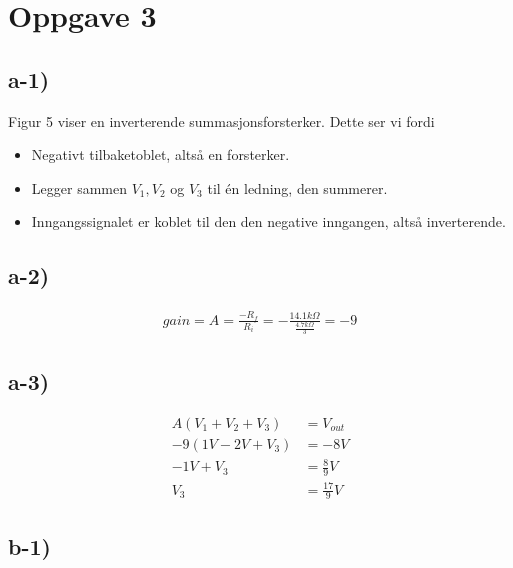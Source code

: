 \documentclass[11pt]{article}
\begin{document}
\section*{Oppgave 3}

\subsection*{a-1)}

Figur 5 viser en inverterende summasjonsforsterker. Dette ser vi fordi
\begin{itemize}
\item Negativt tilbaketoblet, altså en forsterker.
\item Legger sammen $V_{1}, V_{2}$ og $V_{3}$ til én ledning, den summerer.
\item Inngangssignalet er koblet til den den negative inngangen, altså inverterende.
\end{itemize}

\subsection*{a-2)}

\begin{align*}
gain = A = \frac{-R_{f}}{R_{i}} = - \frac{14.1k\Omega}{\frac{4.7k\Omega}{3}} = -9
\end{align*}

\subsection*{a-3)}

\begin{align*}
A(V_1+V_2+V_3) &= V_{out} \\
-9(1V-2V+V_3) &= -8V \\
-1V + V_3 &= \frac{8}{9}V \\
V_3 &= \frac{17}{9}V
\end{align*}

\subsection*{b-1)}
\end{document}
